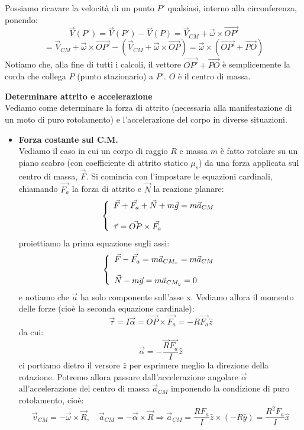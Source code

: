 \documentclass[a4paper,12pt]{article}
\begin{document}
Possiamo ricavare la velocità di un punto $P'$ qualsiasi, interno alla circonferenza, ponendo:
$$ \vec{V}(P') = \vec{V}(P') - \vec{V}(P) = \vec{V}_{CM} + \vec{\omega} \times \vec{OP'} $$
$$  = \vec{V}_{CM} + \vec{\omega} \times \vec{OP'} - (\vec{V}_{CM} + \vec{\omega} \times \vec{OP}) = \vec{\omega} \times (\vec{OP'} + \vec{PO}) $$
Notiamo che, alla fine di tutti i calcoli, il vettore $\vec{OP'} + \vec{PO}$ è semplicemente la corda che collega $P$ (punto stazionario) a $P'$. $O$ è il centro di massa.
\par\smallskip
\textbf{Determinare attrito e accelerazione} \\
Vediamo come determinare la forza di attrito (necessaria alla manifestazione di un moto di puro rotolamento) e l'accelerazione del corpo in diverse situazioni.
\begin{itemize}
  \item \textbf{Forza costante sul C.M.} \\
    Vediamo il caso in cui un corpo di raggio $R$ e massa $m$ è fatto rotolare su un piano scabro (con coefficiente di attrito statico $\mu_s$) da una forza applicata sul centro di massa, $\vec{F}$. Si comincia con l'impostare
    le equazioni cardinali, chiamando $\vec{F_a}$ la forza di attrito e $\vec{N}$ la reazione planare:
    $$ 
    \left\{\begin{array}{l}
        \vec{F} + \vec{F_a} + \vec{N} + m \vec{g} = m\vec{a}_{CM} \cr \\
        \vec{\tau} = \vec{OP} \times \vec{F_a}
    \end{array}\right.
    $$
    proiettiamo la prima equazione sugli assi:
    $$ 
    \left\{\begin{array}{l}
        \vec{F} - \vec{F_a} = m\vec{a}_{CM_x} = m\vec{a}_{CM} \cr \\
        \vec{N} - m\vec{g} = m\vec{a}_{CM_y} = 0
    \end{array}\right.
    $$
    e notiamo che $\vec{a}$ ha solo componente sull'asse x. Vediamo allora il momento delle forze (cioè la seconda equazione cardinale):
    $$ \vec{\tau} = I\vec{\alpha} = \vec{OP} \times \vec{F_a} = -R \vec{F_a}\hat{z} $$
    da cui:
    $$ \vec{\alpha} = -\frac{\vec{R}\vec{F_a}}{I}\hat{z}$$
    ci portiamo dietro il versore $\hat{z}$ per esprimere meglio la direzione della rotazione. Potremo allora passare dall'accelerazione angolare $\vec{\alpha}$ all'accelerazione del centro di massa $\vec{a}_{CM}$ imponendo la condizione
    di puro rotolamento, cioè:
    $$ \vec{v}_{CM} = -\vec{\omega} \times \vec{R}, \quad \vec{a}_{CM} = -\vec{\alpha} \times \vec{R} \Rightarrow \vec{a}_{CM} = \frac{RF_a}{I}\hat{z} \times (-R\hat{y}) = \frac{R^2F_a}{I}\hat{x}$$

\end{itemize}
\end{document}
